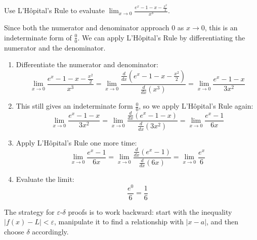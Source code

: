 \exampleline
\begin{example}
Use L'Hôpital's Rule to evaluate \( \lim_{x \to 0} \frac{e^x - 1 - x - \frac{x^2}{2}}{x^3} \).

\begin{solution}
Since both the numerator and denominator approach 0 as \( x \to 0 \), this is an indeterminate form of \( \frac{0}{0} \). We can apply L'Hôpital's Rule by differentiating the numerator and the denominator.

\begin{enumerate}
    \item Differentiate the numerator and denominator:
    \[
    \lim_{x \to 0} \frac{e^x - 1 - x - \frac{x^2}{2}}{x^3} = \lim_{x \to 0} \frac{\frac{d}{dx}(e^x - 1 - x - \frac{x^2}{2})}{\frac{d}{dx}(x^3)} = \lim_{x \to 0} \frac{e^x - 1 - x}{3x^2}
    \]

    \item This still gives an indeterminate form \( \frac{0}{0} \), so we apply L'Hôpital's Rule again:
    \[
    \lim_{x \to 0} \frac{e^x - 1 - x}{3x^2} = \lim_{x \to 0} \frac{\frac{d}{dx}(e^x - 1 - x)}{\frac{d}{dx}(3x^2)} = \lim_{x \to 0} \frac{e^x - 1}{6x}
    \]

    \item Apply L'Hôpital's Rule one more time:
    \[
    \lim_{x \to 0} \frac{e^x - 1}{6x} = \lim_{x \to 0} \frac{\frac{d}{dx}(e^x - 1)}{\frac{d}{dx}(6x)} = \lim_{x \to 0} \frac{e^x}{6}
    \]

    \item Evaluate the limit:
    \[
    \frac{e^0}{6} = \frac{1}{6}
    \]
\end{enumerate}
\end{solution}
\end{example}
\exampleline

\noindent The strategy for \( \varepsilon \)-\( \delta \) proofs is to work backward: start with the inequality \( |f(x) - L| < \varepsilon \), manipulate it to find a relationship with \( |x - a| \), and then choose \( \delta \) accordingly.\\ \\

